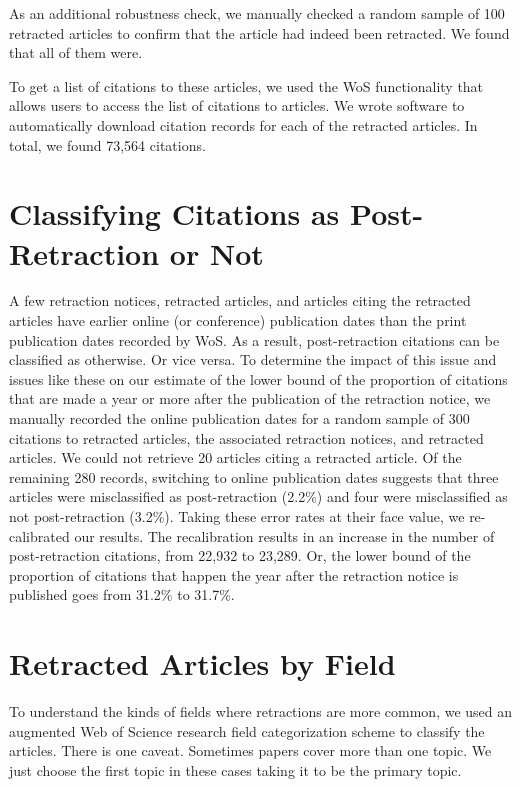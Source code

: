 \documentclass[12pt, letterpaper]{article}
\begin{document}
As an additional robustness check, we manually checked a random sample of 100 retracted articles to confirm that the article had indeed been retracted. We found that all of them were.

To get a list of citations to these articles, we used the WoS functionality that allows users to access the list of citations to articles. We wrote software to automatically download citation records for each of the retracted articles. In total, we found 73,564 citations.
\clearpage

\section{Classifying Citations as Post-Retraction or Not}
\label{pre_post}
A few retraction notices, retracted articles, and articles citing the retracted articles have earlier online (or conference) publication dates than the print publication dates recorded by WoS. As a result, post-retraction citations can be classified as otherwise. Or vice versa. To determine the impact of this issue and issues like these on our estimate of the lower bound of the proportion of citations that are made a year or more after the publication of the retraction notice, we manually recorded the online publication dates for a random sample of 300 citations to retracted articles, the associated retraction notices, and retracted articles. We could not retrieve 20 articles citing a retracted article.  Of the remaining 280 records, switching to online publication dates suggests that three articles were misclassified as post-retraction (2.2\%) and four were misclassified as not post-retraction (3.2\%). Taking these error rates at their face value, we re-calibrated our results. The recalibration results in an increase in the number of post-retraction citations, from 22,932 to 23,289. Or, the lower bound of the proportion of citations that happen the year after the retraction notice is published goes from 31.2\% to 31.7\%.

\clearpage
\section{Retracted Articles by Field}
\label{ret_art_by_field}
To understand the kinds of fields where retractions are more common, we used an augmented Web of Science research field categorization scheme to classify the articles. There is one caveat. Sometimes papers cover more than one topic. We just choose the first topic in these cases taking it to be the primary topic. 
\end{document}
